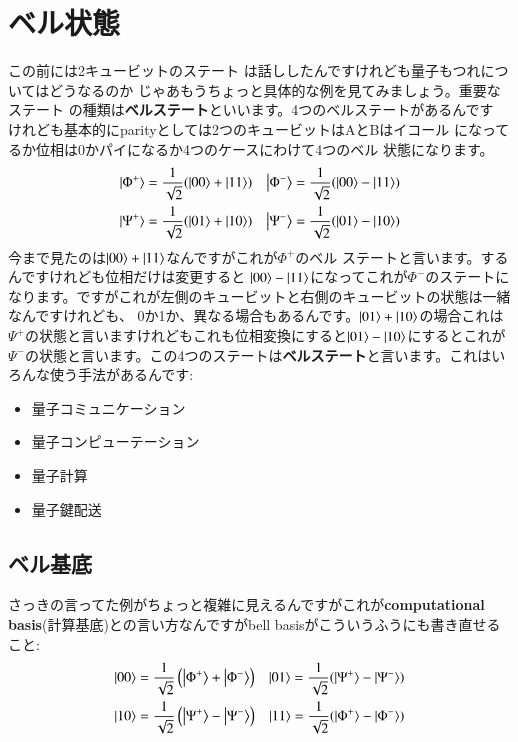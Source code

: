 \section{ベル状態}
この前には2キュービットのステート
は話ししたんですけれども量子もつれについてはどうなるのか
じゃあもうちょっと具体的な例を見てみましょう。重要なステート
の種類は\textbf{ベルステート}といいます。4つのベルステートがあるんです
けれども基本的にparityとしては2つのキュービットはAとBはイコール
になってるか位相は0かパイになるか4つのケースにわけて4つのベル
状態になります。
\begin{equation}
\begin{aligned}
\ket{\Phi^{+}}&=\frac{1}{\sqrt{2}}(|00\rangle+|11\rangle) &\left|\Phi^{-}\right\rangle=\frac{1}{\sqrt{2}}(|00\rangle-|11\rangle) \\
\ket{\Psi^{+}}&=\frac{1}{\sqrt{2}}(|01\rangle+|10\rangle) &\left|\Psi^{-}\right\rangle=\frac{1}{\sqrt{2}}(|01\rangle-|10\rangle)
\end{aligned}
\end{equation}
今まで見たのは$\ket{00}+\ket{11}$なんですがこれが$\Phi^{+}$のベル
ステートと言います。するんですけれども位相だけは変更すると
$\ket{00}-\ket{11}$になってこれが$\Phi^{-}$のステートになります。ですがこれが左側のキュービットと右側のキュービットの状態は一緒なんですけれども、
0か1か、異なる場合もあるんです。$\ket{01}+\ket{10}$の場合これは$\Psi^{+}$の状態と言いますけれどもこれも位相変換にすると$\ket{01}-\ket{10}$にするとこれが$\Psi^{-}$の状態と言います。この4つのステートは\textbf{ベルステート}と言います。これはいろんな使う手法があるんです:
\begin{itemize}
    \item 量子コミュニケーション
    \item 量子コンピューテーション
    \item 量子計算
    \item 量子鍵配送
    
\end{itemize}


\subsection{ベル基底}
さっきの言ってた例がちょっと複雑に見えるんですがこれが\textbf{computational basis}(計算基底)との言い方なんですがbell basisがこういうふうにも書き直せること:
\begin{equation}
\begin{aligned}
|00\rangle &=\frac{1}{\sqrt{2}}\left(\left|\Phi^{+}\right\rangle+\left|\Phi^{-}\right\rangle\right) & 
\ket{01} = \frac{1}{\sqrt2}(\ket{\Psi^{+}} - \ket{\Psi^{-}}) \\
|10\rangle &=\frac{1}{\sqrt{2}}\left(\left|\Psi^{+}\right\rangle-\left|\Psi^{-}\right\rangle\right) & 
\ket{11} = \frac{1}{\sqrt2}(\ket{\Phi^{+}} - \ket{\Phi^{-}})
\end{aligned}
\end{equation}

